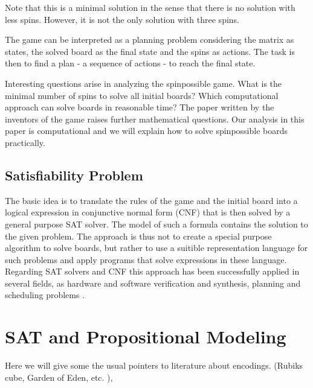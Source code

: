 \documentclass[]{llncs}
\newcommand{\TODO}[1]{ {\color{red}{TODO: #1} }}
\begin{document}
\vspace{0.5cm}

Note that this is a minimal solution in the sense that there is no solution with less spins. However, it is not the
only solution with three spins. 

The game can be interpreted as a planning problem considering the matrix as states, the solved board as the final state and
the spins as actions. The task is then to find a plan - a sequence of actions - to reach the final state.

Interesting questions arise in analyzing the spinpossible game. What is the minimal number of spins to solve all initial
boards? Which computational approach can solve boards in reasonable time? The paper \cite{Sutherland2011} written by the
inventors of the game raises further mathematical questions. Our analysis in this paper  is computational and we will
explain how to solve spinpossible boards practically. \TODO{Give more questions and restructure, describe the
motivation} 

\subsection{Satisfiability Problem}

The basic idea is to translate the rules of the game and the initial board into a logical expression in conjunctive
normal form (CNF) that is then solved by a general purpose SAT solver. The model of such a formula contains the solution
to the given problem. The approach is thus not to create a special purpose algorithm to solve boards, but rather to use
a suitible representation language for such problems and apply programs that solve expressions in these language.
Regarding SAT solvers and CNF this approach has been successfully applied in several fields, as hardware and software
verification and synthesis, planning and scheduling problems \cite{Biere2009}. 

\TODO{Is Spinpossible $n\cdot m$ with a given number of steps $N$ really NP complete? How to transform 3SAT into
spinpossible? Alternatives...}


\section{SAT and Propositional Modeling}

Here we will give some the usual pointers to literature about encodings. (Rubiks cube, Garden of Eden, etc. ),
\cite{Chen2011}
\end{document}
